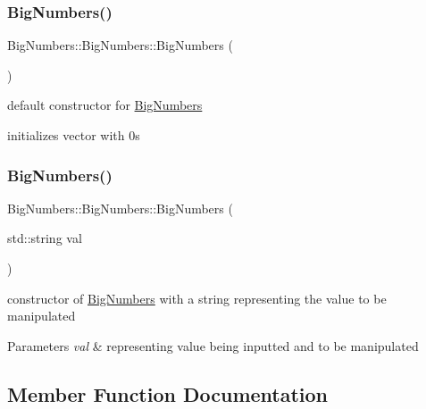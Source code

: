 \subsubsection{\texorpdfstring{BigNumbers()}{BigNumbers()}\hspace{0.1cm}{\footnotesize\ttfamily [1/2]}}
{\footnotesize\ttfamily Big\+Numbers\+::\+Big\+Numbers\+::\+Big\+Numbers (\begin{DoxyParamCaption}{ }\end{DoxyParamCaption})}

default constructor for \mbox{\hyperlink{class_big_numbers_1_1_big_numbers}{Big\+Numbers}}

initializes vector with 0\textquotesingle{}s \mbox{\label{class_big_numbers_1_1_big_numbers_a4dcfaac3c63a377ef04a6b5e6bd2fc68}} 
\subsubsection{\texorpdfstring{BigNumbers()}{BigNumbers()}\hspace{0.1cm}{\footnotesize\ttfamily [2/2]}}
{\footnotesize\ttfamily Big\+Numbers\+::\+Big\+Numbers\+::\+Big\+Numbers (\begin{DoxyParamCaption}\item[{std\+::string}]{val }\end{DoxyParamCaption})}

constructor of \mbox{\hyperlink{class_big_numbers_1_1_big_numbers}{Big\+Numbers}} with a string representing the value to be manipulated 
\begin{DoxyParams}{Parameters}
{\em val} & representing value being inputted and to be manipulated \\
\hline
\end{DoxyParams}


\subsection{Member Function Documentation}
\mbox{\label{class_big_numbers_1_1_big_numbers_a824d0548f48150ceeb4bcf9bc818e7ef}} 

